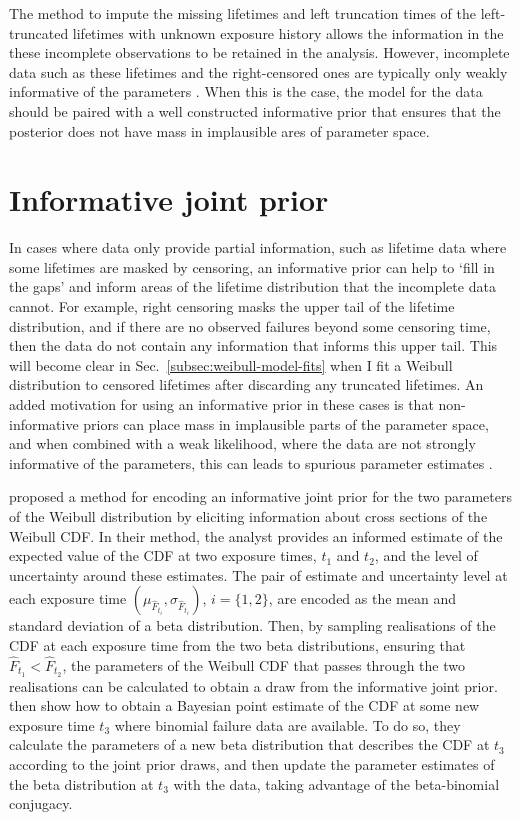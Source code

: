 The method to impute the missing lifetimes and left truncation times of the left-truncated lifetimes with unknown exposure history allows the information in the these incomplete observations to be retained in the analysis. However, incomplete data such as these lifetimes and the right-censored ones are typically only weakly informative of the parameters \citep{tian2024}. When this is the case, the model for the data should be paired with a well constructed informative prior that ensures that the posterior does not have mass in implausible ares of parameter space. 

\section{Informative joint prior} \label{sec:weibull-joint-prior}

In cases where data only provide partial information, such as lifetime data where some lifetimes are masked by censoring, an informative prior can help to `fill in the gaps' and inform areas of the lifetime distribution that the incomplete data cannot. For example, right censoring masks the upper tail of the lifetime distribution, and if there are no observed failures beyond some censoring time, then the data do not contain any information that informs this upper tail. This will become clear in Sec.~\ref{subsec:weibull-model-fits} when I fit a Weibull distribution to censored lifetimes after discarding any truncated lifetimes. An added motivation for using an informative prior in these cases is that non-informative priors can place mass in implausible parts of the parameter space, and when combined with a weak likelihood, where the data are not strongly informative of the parameters, this can leads to spurious parameter estimates \citep{tian2024}.

\citet{kaminskiy2005} proposed a method for encoding an informative joint prior for the two parameters of the Weibull distribution by eliciting information about cross sections of the Weibull CDF. In their method, the analyst provides an informed estimate of the expected value of the CDF at two exposure times, $t_1$ and $t_2$, and the level of uncertainty around these estimates. The pair of estimate and uncertainty level at each exposure time $(\mu_{\hat{F}_{t_i}}, \sigma_{\hat{F}_{t_i}})$, $i = \{1, 2\}$, are encoded as the mean and standard deviation of a beta distribution. Then, by sampling realisations of the CDF at each exposure time from the two beta distributions, ensuring that $\hat{F}_{t_1} < \hat{F}_{t_2}$, the parameters of the Weibull CDF that passes through the two realisations can be calculated to obtain a draw from the informative joint prior. \citet{kaminskiy2005} then show how to obtain a Bayesian point estimate of the CDF at some new exposure time $t_3$ where binomial failure data are available. To do so, they calculate the parameters of a new beta distribution that describes the CDF at $t_3$ according to the joint prior draws, and then update the parameter estimates of the beta distribution at $t_3$ with the data, taking advantage of the beta-binomial conjugacy.

